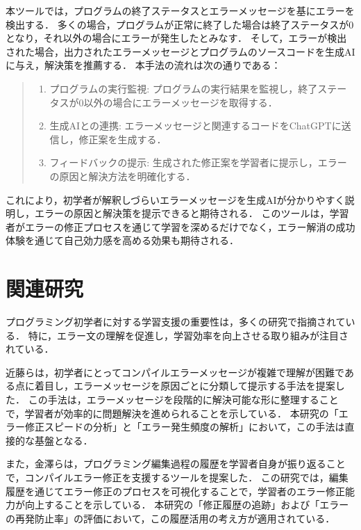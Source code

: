 \documentclass[12pt,twoside]{jbook}
\begin{document}
本ツールでは，プログラムの終了ステータスとエラーメッセージを基にエラーを検出する．
多くの場合，プログラムが正常に終了した場合は終了ステータスが0となり，それ以外の場合にエラーが発生したとみなす．
そして，エラーが検出された場合，出力されたエラーメッセージとプログラムのソースコードを生成AIに与え，解決策を推薦する．
本手法の流れは次の通りである：
\begin{quote}
    \begin{enumerate}
	 \item プログラムの実行監視:
      プログラムの実行結果を監視し，終了ステータスが0以外の場合にエラーメッセージを取得する．
	 \item 生成AIとの連携:
	    エラーメッセージと関連するコードをChatGPTに送信し，修正案を生成する．
	 \item フィードバックの提示:
	    生成された修正案を学習者に提示し，エラーの原因と解決方法を明確化する．
    \end{enumerate}
\end{quote}

これにより，初学者が解釈しづらいエラーメッセージを生成AIが分かりやすく説明し，エラーの原因と解決策を提示できると期待される．
このツールは，学習者がエラーの修正プロセスを通じて学習を深めるだけでなく，エラー解消の成功体験を通じて自己効力感を高める効果も期待される．

\chapter{関連研究}
プログラミング初学者に対する学習支援の重要性は，多くの研究で指摘されている．
特に，エラー文の理解を促進し，学習効率を向上させる取り組みが注目されている．

近藤ら\cite{2023repit_kondo}は，初学者にとってコンパイルエラーメッセージが複雑で理解が困難である点に着目し，エラーメッセージを原因ごとに分類して提示する手法を提案した．
この手法は，エラーメッセージを段階的に解決可能な形に整理することで，学習者が効率的に問題解決を進められることを示している．
本研究の「エラー修正スピードの分析」と「エラー発生頻度の解析」において，この手法は直接的な基盤となる．

また，金澤ら\cite{2019ipsj_kanazawa}は，プログラミング編集過程の履歴を学習者自身が振り返ることで，コンパイルエラー修正を支援するツールを提案した．
この研究では，編集履歴を通じてエラー修正のプロセスを可視化することで，学習者のエラー修正能力が向上することを示している．
本研究の「修正履歴の追跡」および「エラーの再発防止率」の評価において，この履歴活用の考え方が適用されている．
\end{document}
